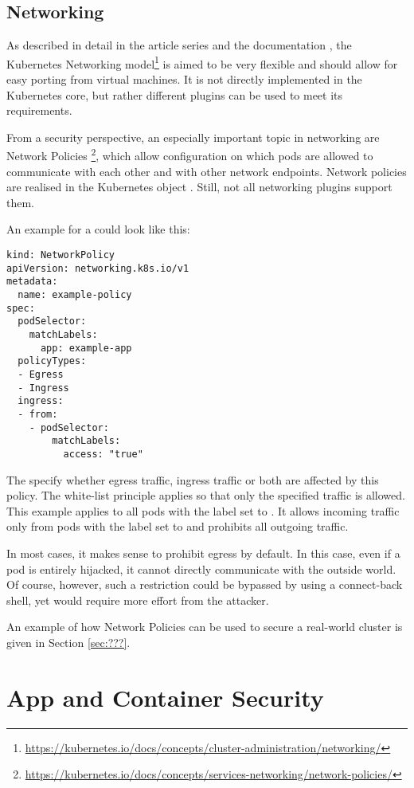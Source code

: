 \subsection{Networking}

As described in detail in the article series \textcite{NetworkingExplained} and the documentation \textcite{k8sdocs}, the Kubernetes Networking model\footnote{\url{https://kubernetes.io/docs/concepts/cluster-administration/networking/}} is aimed to be very flexible and should allow for easy porting from virtual machines. It is not directly implemented in the Kubernetes core, but rather different plugins can be used to meet its requirements.

From a security perspective, an especially important topic in networking are Network Policies \footnote{\url{https://kubernetes.io/docs/concepts/services-networking/network-policies/}}, which allow configuration on which pods are allowed to communicate with each other and with other network endpoints. Network policies are realised in the Kubernetes object . Still, not all networking plugins support them.

An example for a  could look like this:

\begin{lstlisting}[frame=single]
kind: NetworkPolicy
apiVersion: networking.k8s.io/v1
metadata:
  name: example-policy
spec:
  podSelector:
    matchLabels:
      app: example-app
  policyTypes:
  - Egress
  - Ingress
  ingress:
  - from:
    - podSelector:
        matchLabels:
          access: "true"
\end{lstlisting}

The  specify whether egress traffic, ingress traffic or both are affected by this policy. The white-list principle applies so that only the specified traffic is allowed. This example applies to all pods with the label  set to . It allows incoming traffic only from pods with the label  set to  and prohibits all outgoing traffic.

In most cases, it makes sense to prohibit egress by default. In this case, even if a pod is entirely hijacked, it cannot directly communicate with the outside world. Of course, however, such a restriction could be bypassed by using a connect-back shell, yet would require more effort from the attacker. 

An example of how Network Policies can be used to secure a real-world cluster is given in Section \ref{sec:???}. %

\section{App and Container Security} \label{sec:layer4}

